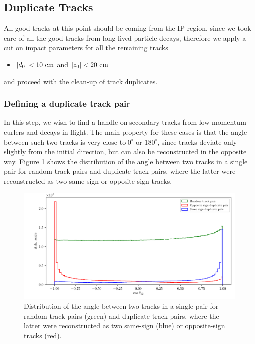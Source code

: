 \subsection{Duplicate Tracks}
All good tracks at this point should be coming from the IP region, since we took care of all the good tracks from long-lived particle decays, therefore we apply a cut on impact parameters for all the remaining tracks
\begin{itemize}
	\item $\vert d_0 \vert < 10\mathrm{~cm}$ and $\vert z_0 \vert < 20\mathrm{~cm}$
\end{itemize} 

and proceed with the clean-up of track duplicates.

\subsubsection{Defining a duplicate track pair}

In this step, we wish to find a handle on secondary tracks from low momentum curlers and decays in flight. The main property for these cases is that the angle between such two tracks is very close to $0^\circ$ or $180^\circ$, since tracks deviate only slightly from the initial direction, but can also be reconstructed in the opposite way. Figure \ref{fig:ROE_dupAngleInit} shows the distribution of the angle between two tracks in a single pair for random track pairs and duplicate track pairs, where the latter were reconstructed as two same-sign or opposite-sign tracks.

\begin{figure}[!htb]
	\centering
	\captionsetup{width=0.8\linewidth}
	\includegraphics[width=\linewidth]{fig/ROECleanup_dup_angle_initial}
	\caption{Distribution of the angle between two tracks in a single pair for random track pairs (green) and duplicate track pairs, where the latter were reconstructed as two same-sign (blue) or opposite-sign tracks (red).}
	\label{fig:ROE_dupAngleInit}
\end{figure}

